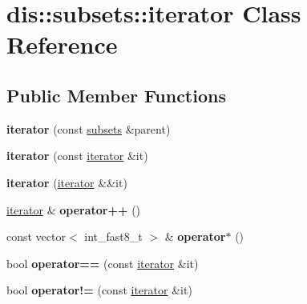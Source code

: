 \hypertarget{classdis_1_1subsets_1_1iterator}{\section{dis\-:\-:subsets\-:\-:iterator Class Reference}
\label{classdis_1_1subsets_1_1iterator}
}
\subsection*{Public Member Functions}
\begin{DoxyCompactItemize}
\item 
\hypertarget{classdis_1_1subsets_1_1iterator_a8b9040d208594057e707f3baf40c04b5}{{\bfseries iterator} (const \hyperlink{classdis_1_1subsets}{subsets} \&parent)}\label{classdis_1_1subsets_1_1iterator_a8b9040d208594057e707f3baf40c04b5}

\item 
\hypertarget{classdis_1_1subsets_1_1iterator_a97acec9a917226bf7b6d24cf11511130}{{\bfseries iterator} (const \hyperlink{classdis_1_1subsets_1_1iterator}{iterator} \&it)}\label{classdis_1_1subsets_1_1iterator_a97acec9a917226bf7b6d24cf11511130}

\item 
\hypertarget{classdis_1_1subsets_1_1iterator_abfb37e08150b3e82b356447abe065557}{{\bfseries iterator} (\hyperlink{classdis_1_1subsets_1_1iterator}{iterator} \&\&it)}\label{classdis_1_1subsets_1_1iterator_abfb37e08150b3e82b356447abe065557}

\item 
\hypertarget{classdis_1_1subsets_1_1iterator_a70bba5038844f99c78c04d2b71bb1875}{\hyperlink{classdis_1_1subsets_1_1iterator}{iterator} \& {\bfseries operator++} ()}\label{classdis_1_1subsets_1_1iterator_a70bba5038844f99c78c04d2b71bb1875}

\item 
\hypertarget{classdis_1_1subsets_1_1iterator_ae144734c24b5456caef63b924871d274}{const vector$<$ int\-\_\-fast8\-\_\-t $>$ \& {\bfseries operator$\ast$} ()}\label{classdis_1_1subsets_1_1iterator_ae144734c24b5456caef63b924871d274}

\item 
\hypertarget{classdis_1_1subsets_1_1iterator_aa6694992623942f11585b269e1f06856}{bool {\bfseries operator==} (const \hyperlink{classdis_1_1subsets_1_1iterator}{iterator} \&it)}\label{classdis_1_1subsets_1_1iterator_aa6694992623942f11585b269e1f06856}

\item 
\hypertarget{classdis_1_1subsets_1_1iterator_a8d760309b2e824f9cb4cb7b89d5e5197}{bool {\bfseries operator!=} (const \hyperlink{classdis_1_1subsets_1_1iterator}{iterator} \&it)}\label{classdis_1_1subsets_1_1iterator_a8d760309b2e824f9cb4cb7b89d5e5197}

\end{DoxyCompactItemize}
